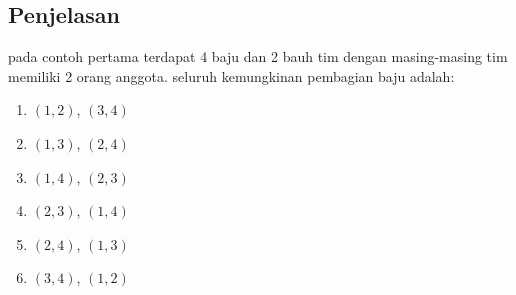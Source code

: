 \documentclass{article}
\begin{document}
\subsection*{Penjelasan}
pada contoh pertama terdapat 4 baju dan 2 bauh tim dengan masing-masing tim memiliki 2 orang anggota.
seluruh kemungkinan pembagian baju adalah:
\begin{enumerate}
    \item $(1,2)$, $(3,4)$
    \item $(1,3)$, $(2,4)$
    \item $(1,4)$, $(2,3)$
    \item $(2,3)$, $(1,4)$
    \item $(2,4)$, $(1,3)$
    \item $(3,4)$, $(1,2)$
\end{enumerate}


\pagebreak
\end{document}
